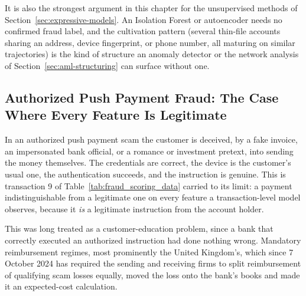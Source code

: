 \documentclass[../ai_in_finance]{subfiles}
\begin{document}
It is also the strongest argument in this chapter for the unsupervised methods of Section~\ref{sec:expressive-models}. An Isolation Forest or autoencoder needs no confirmed fraud label, and the cultivation pattern (several thin-file accounts sharing an address, device fingerprint, or phone number, all maturing on similar trajectories) is the kind of structure an anomaly detector or the network analysis of Section~\ref{sec:aml-structuring} can surface without one.

\subsection{Authorized Push Payment Fraud: The Case Where Every Feature Is Legitimate}
\label{sec:app-fraud}

In an authorized push payment scam the customer is deceived, by a fake invoice, an impersonated bank official, or a romance or investment pretext, into sending the money themselves. The credentials are correct, the device is the customer's usual one, the authentication succeeds, and the instruction is genuine. This is transaction 9 of Table~\ref{tab:fraud_scoring_data} carried to its limit: a payment indistinguishable from a legitimate one on every feature a transaction-level model observes, because it \emph{is} a legitimate instruction from the account holder.

This was long treated as a customer-education problem, since a bank that correctly executed an authorized instruction had done nothing wrong. Mandatory reimbursement regimes, most prominently the United Kingdom's, which since 7 October 2024 has required the sending and receiving firms to split reimbursement of qualifying scam losses equally, moved the loss onto the bank's books and made it an expected-cost calculation.
\end{document}

